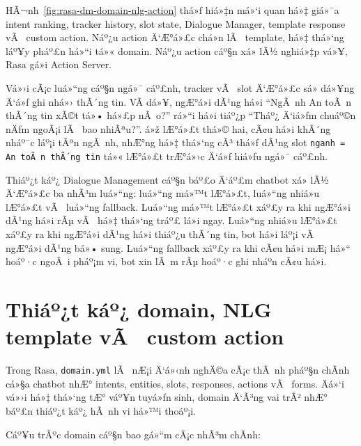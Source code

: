 ﻿\documentclass[12pt,a4paper]{report}
\begin{document}
HÃ¬nh~\ref{fig:rasa-dm-domain-nlg-action} thá»ƒ hiá»‡n má»‘i quan há»‡ giá»¯a intent ranking, tracker history, slot state, Dialogue Manager, template response vÃ  custom action. Náº¿u action Ä‘Æ°á»£c chá»n lÃ  template, há»‡ thá»‘ng láº¥y pháº£n há»“i tá»« domain. Náº¿u action cáº§n xá»­ lÃ½ nghiá»‡p vá»¥, Rasa gá»i Action Server.

Vá»›i cÃ¡c luá»“ng cáº§n ngá»¯ cáº£nh, tracker vÃ  slot Ä‘Æ°á»£c sá»­ dá»¥ng Ä‘á»ƒ ghi nhá»› thÃ´ng tin. VÃ­ dá»¥, ngÆ°á»i dÃ¹ng há»i ``NgÃ nh An toÃ n thÃ´ng tin xÃ©t tá»• há»£p nÃ o?'' rá»“i há»i tiáº¿p ``Tháº¿ Ä‘iá»ƒm chuáº©n nÄƒm ngoÃ¡i lÃ  bao nhiÃªu?''. á»ž lÆ°á»£t thá»© hai, cÃ¢u há»i khÃ´ng nháº¯c láº¡i tÃªn ngÃ nh, nhÆ°ng há»‡ thá»‘ng cÃ³ thá»ƒ dÃ¹ng slot \texttt{nganh = An toÃ n thÃ´ng tin} tá»« lÆ°á»£t trÆ°á»›c Ä‘á»ƒ hiá»ƒu ngá»¯ cáº£nh.

Thiáº¿t káº¿ Dialogue Management cáº§n báº£o Ä‘áº£m chatbot xá»­ lÃ½ Ä‘Æ°á»£c ba nhÃ³m luá»“ng: luá»“ng má»™t lÆ°á»£t, luá»“ng nhiá»u lÆ°á»£t vÃ  luá»“ng fallback. Luá»“ng má»™t lÆ°á»£t xáº£y ra khi ngÆ°á»i dÃ¹ng há»i rÃµ vÃ  há»‡ thá»‘ng tráº£ lá»i ngay. Luá»“ng nhiá»u lÆ°á»£t xáº£y ra khi ngÆ°á»i dÃ¹ng há»i thiáº¿u thÃ´ng tin, bot há»i láº¡i vÃ  ngÆ°á»i dÃ¹ng bá»• sung. Luá»“ng fallback xáº£y ra khi cÃ¢u há»i mÆ¡ há»“ hoáº·c ngoÃ i pháº¡m vi, bot xin lÃ m rÃµ hoáº·c ghi nháº­n cÃ¢u há»i.




\section{Thiáº¿t káº¿ domain, NLG template vÃ  custom action}

Trong Rasa, \texttt{domain.yml} lÃ  nÆ¡i Ä‘á»‹nh nghÄ©a cÃ¡c thÃ nh pháº§n chÃ­nh cá»§a chatbot nhÆ° intents, entities, slots, responses, actions vÃ  forms. Äá»‘i vá»›i há»‡ thá»‘ng tÆ° váº¥n tuyá»ƒn sinh, domain Ä‘Ã³ng vai trÃ² nhÆ° báº£n thiáº¿t káº¿ hÃ nh vi há»™i thoáº¡i.

Cáº¥u trÃºc domain cáº§n bao gá»“m cÃ¡c nhÃ³m chÃ­nh:
\end{document}
